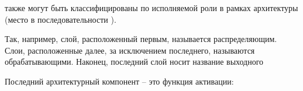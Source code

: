  также могут быть классифицированы по исполняемой роли в рамках архитектуры (место в последовательности ).

Так, например, слой, расположенный первым, называется распределяющим. Слои, расположенные далее, за исключением последнего, называются обрабатывающими. Наконец, последний слой носит название выходного 

Последний архитектурный компонент  -- это функция активации:

\begin{SCn}
\end{SCn}

